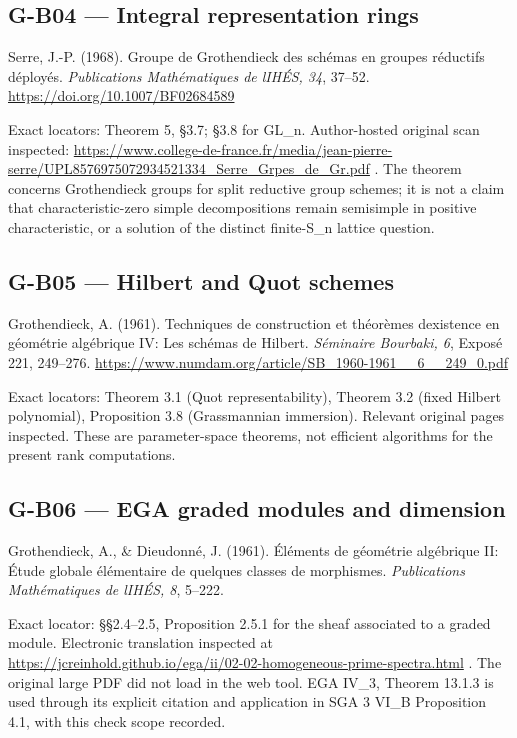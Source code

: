 \documentclass[11pt,a4paper]{article}
\theoremstyle{definition}\newtheorem{definition}{Definition}
\begin{document}
\subsection{G-B04 --- Integral representation
rings}\label{g-b04--integral-representation-rings}

Serre, J.-P. (1968). Groupe de Grothendieck des schémas en groupes
réductifs déployés. \emph{Publications Mathématiques de
l\textquotesingle IHÉS, 34}, 37--52.
\url{https://doi.org/10.1007/BF02684589}

Exact locators: Theorem 5, §3.7; §3.8 for GL\_n. Author-hosted original
scan inspected:
\url{https://www.college-de-france.fr/media/jean-pierre-serre/UPL8576975072934521334_Serre_Grpes_de_Gr.pdf}
. The theorem concerns Grothendieck groups for split reductive group
schemes; it is not a claim that characteristic-zero simple
decompositions remain semisimple in positive characteristic, or a
solution of the distinct finite-S\_n lattice question.

\subsection{G-B05 --- Hilbert and Quot
schemes}\label{g-b05--hilbert-and-quot-schemes}

Grothendieck, A. (1961). Techniques de construction et théorèmes
d\textquotesingle existence en géométrie algébrique IV: Les schémas de
Hilbert. \emph{Séminaire Bourbaki, 6}, Exposé 221, 249--276.
\url{https://www.numdam.org/article/SB_1960-1961__6__249_0.pdf}

Exact locators: Theorem 3.1 (Quot representability), Theorem 3.2 (fixed
Hilbert polynomial), Proposition 3.8 (Grassmannian immersion). Relevant
original pages inspected. These are parameter-space theorems, not
efficient algorithms for the present rank computations.

\subsection{G-B06 --- EGA graded modules and
dimension}\label{g-b06--ega-graded-modules-and-dimension}

Grothendieck, A., \& Dieudonné, J. (1961). Éléments de géométrie
algébrique II: Étude globale élémentaire de quelques classes de
morphismes. \emph{Publications Mathématiques de l\textquotesingle IHÉS,
8}, 5--222.

Exact locator: §§2.4--2.5, Proposition 2.5.1 for the sheaf associated to
a graded module. Electronic translation inspected at
\url{https://jcreinhold.github.io/ega/ii/02-02-homogeneous-prime-spectra.html}
. The original large PDF did not load in the web tool. EGA IV\_3,
Theorem 13.1.3 is used through its explicit citation and application in
SGA 3 VI\_B Proposition 4.1, with this check scope recorded.
\end{document}
